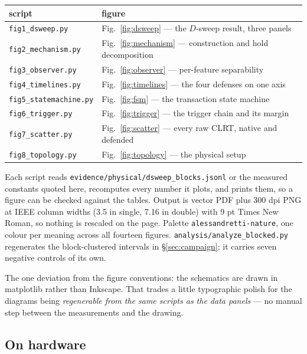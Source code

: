 \documentclass[10pt,a4paper,oneside]{article}
\newcommand{\code}[1]{\texttt{\small #1}}
\begin{document}
\begin{center}\small
\begin{tabular}{@{}ll@{}}
\toprule
\textbf{script} & \textbf{figure} \\
\midrule
\code{fig1\_dsweep.py}       & Fig.~\ref{fig:dsweep} --- the $D$-sweep result, three panels \\
\code{fig2\_mechanism.py}    & Fig.~\ref{fig:mechanism} --- construction and hold decomposition \\
\code{fig3\_observer.py}     & Fig.~\ref{fig:observer} --- per-feature separability \\
\code{fig4\_timelines.py}    & Fig.~\ref{fig:timelines} --- the four defenses on one axis \\
\code{fig5\_statemachine.py} & Fig.~\ref{fig:fsm} --- the transaction state machine \\
\code{fig6\_trigger.py}      & Fig.~\ref{fig:trigger} --- the trigger chain and its margin \\
\code{fig7\_scatter.py}      & Fig.~\ref{fig:scatter} --- every raw CLRT, native and defended \\
\code{fig8\_topology.py}     & Fig.~\ref{fig:topology} --- the physical setup \\
\bottomrule
\end{tabular}
\end{center}

Each script reads \code{evidence/physical/dsweep\_blocks.jsonl} or the measured constants
quoted here, recomputes every number it plots, and prints them, so a figure can be checked
against the tables. Output is vector PDF plus 300 dpi PNG at IEEE column widths
(3.5 in single, 7.16 in double) with 9 pt Times New Roman, so nothing is rescaled on the
page. Palette \code{alessandretti-nature}, one colour per meaning across all fourteen figures.
\code{analysis/analyze\_blocked.py} regenerates the block-clustered intervals in
\S\ref{sec:campaign}; it carries seven negative controls of its own.

The one deviation from the figure conventions: the schematics are drawn in matplotlib rather
than Inkscape. That trades a little typographic polish for the diagrams being
\emph{regenerable from the same scripts as the data panels} --- no manual step between the
measurements and the drawing.

\subsection{On hardware}
\end{document}
